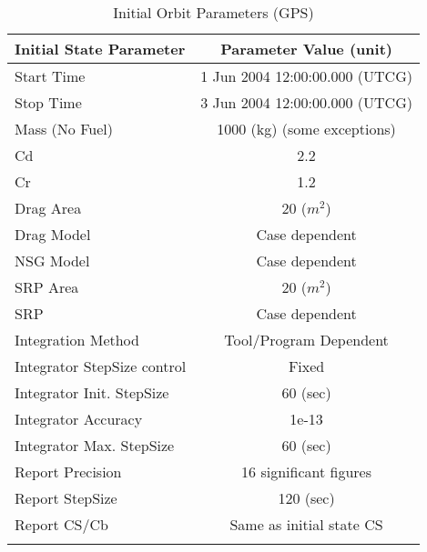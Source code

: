 \begin{table}[htbp!]
\centering \caption{Initial Orbit Parameters (GPS)}
      \begin{tabular}{lc}
      \hline\hline
            Initial State Parameter & Parameter Value (unit)\\
            \hline
            Start Time & 1 Jun 2004 12:00:00.000 (UTCG)\\
            Stop Time & 3 Jun 2004 12:00:00.000 (UTCG)\\
            
            Mass (No Fuel) & 1000 (kg) (some exceptions)\\
            Cd & 2.2\\
            Cr & 1.2\\
            Drag Area & 20 ($m^2$)\\
            Drag Model & Case dependent\\
            NSG Model & Case dependent\\
            SRP Area & 20 ($m^2$)\\
            SRP & Case dependent\\
            Integration Method & Tool/Program Dependent\\
            Integrator StepSize control & Fixed\\
            Integrator Init. StepSize & 60 (sec)\\
            Integrator Accuracy & 1e-13\\
            Integrator Max. StepSize & 60 (sec)\\
            Report Precision & 16 significant figures\\
            Report StepSize & 120 (sec)\\
            Report CS/Cb & Same as initial state CS\\
      \hline\hline
      \label{Table: InitStateGPS}
\end{tabular}
\end{table}


